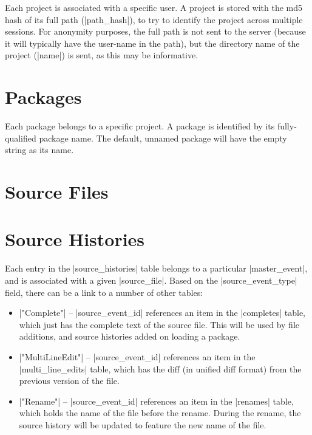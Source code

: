 \documentclass{book}
\begin{document}

Each project is associated with a specific user.  A project is stored with the
md5 hash of its full path (|path_hash|), to try to identify the project across multiple
sessions.  For anonymity purposes, the full path is not sent to the server
(because it will typically have the user-name in the path), but the directory
name of the project (|name|) is sent, as this may be informative.

\section{Packages}


Each package belongs to a specific project.  A package is identified by its
fully-qualified package name.  The default, unnamed package will have the
empty string as its name.

\section{Source Files}

\section{Source Histories}


Each entry in the |source_histories| table belongs to a particular
|master_event|, and is associated with a given |source_file|.  Based on the
|source_event_type| field, there can be a link to a number of other
tables:

\begin{itemize}
\item |"Complete"| -- |source_event_id| references an item in the |completes|
  table, which just has the complete text of the source file.  This will be
  used by file additions, and source histories added on loading a package.
\item |"MultiLineEdit"| -- |source_event_id| references an item in the
  |multi_line_edits| table, which has the diff (in unified diff format) from
  the previous version of the file.
\item |"Rename"| -- |source_event_id| references an item in the |renames|
  table, which holds the name of the file before the rename.  During the
  rename, the source history will be updated to feature the new name of the file.
\end{itemize}
\end{document}
